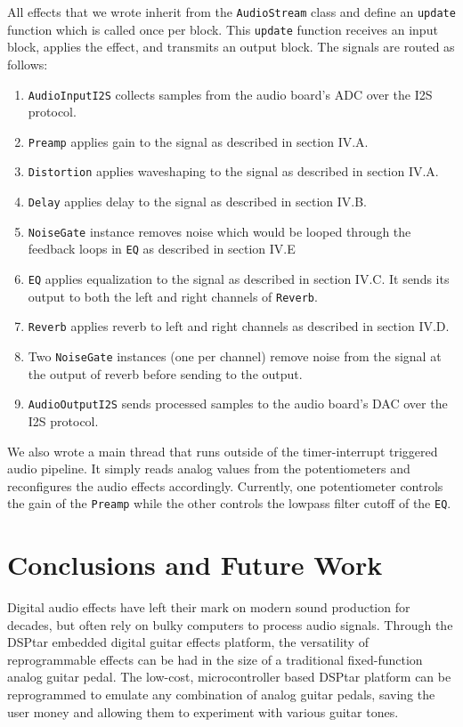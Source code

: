 \documentclass[conference]{IEEEtran}
\begin{document}
All effects that we wrote inherit from the \texttt{AudioStream} class and define an \texttt{update} function which is called once per block. This \texttt{update} function receives an input block, applies the effect, and transmits an output block. The signals are routed as follows:

\begin{enumerate}
    \item \texttt{AudioInputI2S} collects samples from the audio board's ADC over the I2S protocol.
    \item \texttt{Preamp} applies gain to the signal as described in section IV.A.
    \item \texttt{Distortion} applies waveshaping to the signal as described in section IV.A.
    \item \texttt{Delay} applies delay to the signal as described in section IV.B.
    \item \texttt{NoiseGate} instance removes noise which would be looped through the feedback loops in \texttt{EQ} as described in section IV.E
    \item \texttt{EQ} applies equalization to the signal as described in section IV.C. It sends its output to both the left and right channels of \texttt{Reverb}.
    \item \texttt{Reverb} applies reverb to left and right channels as described in section IV.D.
    \item Two \texttt{NoiseGate} instances (one per channel) remove noise from the signal at the output of reverb before sending to the output.
    \item \texttt{AudioOutputI2S} sends processed samples to the audio board's DAC over the I2S protocol.
\end{enumerate}

We also wrote a main thread that runs outside of the timer-interrupt triggered audio pipeline. It simply reads analog values from the potentiometers and reconfigures the audio effects accordingly. Currently, one potentiometer controls the gain of the \texttt{Preamp} while the other controls the lowpass filter cutoff of the \texttt{EQ}.

\section{Conclusions and Future Work}

Digital audio effects have left their mark on modern sound production for decades, but often rely on bulky computers to process audio signals. Through the DSPtar embedded digital guitar effects platform, the versatility of reprogrammable effects can be had in the size of a traditional fixed-function analog guitar pedal. The low-cost, microcontroller based DSPtar platform can be reprogrammed to emulate any combination of analog guitar pedals, saving the user money and allowing them to experiment with various guitar tones.
\end{document}
